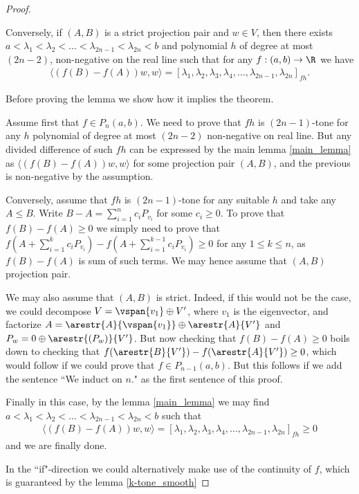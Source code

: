 \begin{proof}
\begin{lem}
		Conversely, if $(A, B)$ is a strict projection pair and $w \in V$, then there exists $a < \lambda_{1} < \lambda_{2} < \ldots < \lambda_{2 n - 1} < \lambda_{2 n} < b$ and polynomial $h$ of degree at most $(2 n - 2)$, non-negative on the real line such that for any $f : (a, b) \to \R$ we have
		\begin{align*}
			\langle (f(B) - f(A)) w, w \rangle = [\lambda_{1}, \lambda_{2}, \lambda_{3}, \lambda_{4}, \ldots, \lambda_{2n - 1}, \lambda_{2 n}]_{f h}.
		\end{align*}
	\end{lem}

	Before proving the lemma we show how it implies the theorem.

	Assume first that $f \in P_{n}(a, b)$. We need to prove that $f h$ is $(2 n - 1)$-tone for any $h$ polynomial of degree at most $(2 n - 2)$ non-negative on real line. But any divided difference of such $f h$ can be expressed by the main lemma \ref{main_lemma} as $\langle (f(B) - f(A)) w, w \rangle$ for some projection pair $(A, B)$, and the previous is non-negative by the assumption.

	Conversely, assume that $f h$ is $(2 n - 1)$-tone for any suitable $h$ and take any $A \leq B$. Write $B - A = \sum_{i = 1}^{n} c_{i} P_{v_{i}}$ for some $c_{i} \geq 0$. To prove that $f(B) - f(A) \geq 0$ we simply need to prove that $f(A + \sum_{i = 1}^{k} c_{i} P_{v_{i}}) - f(A + \sum_{i = 1}^{k - 1} c_{i} P_{v_{i}}) \geq 0$ for any $1 \leq k \leq n$, as $f(B) - f(A)$ is sum of such terms. We may hence assume that $(A, B)$ projection pair.

	We may also assume that $(A, B)$ is strict. Indeed, if this would not be the case, we could decompose $V = \vspan\{v_{1}\} \oplus V'$, where $v_{1}$ is the eigenvector, and factorize $A = \arestr{A}{\vspan\{v_{1}\}} \oplus \arestr{A}{V'}$ and $P_{w} = 0 \oplus \arestr{(P_{w})}{V'}$. But now checking that $f(B) - f(A) \geq 0$ boils down to checking that $f(\arestr{B}{V'}) - f(\arestr{A}{V'}) \geq 0$, which would follow if we could prove that $f \in P_{n - 1}(a, b)$. But this follows if we add the sentence ``We induct on $n$." as the first sentence of this proof.

	Finally in this case, by the lemma \ref{main_lemma} we may find $a < \lambda_{1} < \lambda_{2} < \ldots < \lambda_{2 n - 1} < \lambda_{2 n} < b$ such that
	\begin{align*}
		\langle (f(B) - f(A)) w, w \rangle = [\lambda_{1}, \lambda_{2}, \lambda_{3}, \lambda_{4}, \ldots, \lambda_{2n - 1}, \lambda_{2 n}]_{f h} \geq 0
	\end{align*}
	and we are finally done.

	In the ``if"-direction we could alternatively make use of the continuity of $f$, which is guaranteed by the lemma \ref{k-tone_smooth}

\end{proof}

